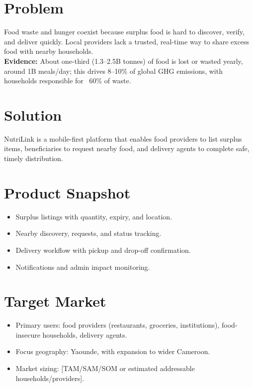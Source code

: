 \documentclass[11pt,a4paper]{article}
\begin{document}
\begin{minipage}[t]{0.48\textwidth}
\footnotesize
\section*{Problem}
\justifying
Food waste and hunger coexist because surplus food is hard to discover, verify, and deliver quickly. Local providers lack a trusted, real-time way to share excess food with nearby households.\\[4pt]
\textbf{Evidence:} About one-third (1.3--2.5B tonnes) of food is lost or wasted yearly, around 1B meals/day; this drives 8--10\% of global GHG emissions, with households responsible for ~60\% of waste.

\section*{Solution}
\justifying
NutriLink is a mobile-first platform that enables food providers to list surplus items, beneficiaries to request nearby food, and delivery agents to complete safe, timely distribution.

\section*{Product Snapshot}
\begin{itemize}
    \item Surplus listings with quantity, expiry, and location.
    \item Nearby discovery, requests, and status tracking.
    \item Delivery workflow with pickup and drop-off confirmation.
    \item Notifications and admin impact monitoring.
\end{itemize}

\section*{Target Market}
\begin{itemize}
    \item Primary users: food providers (restaurants, groceries, institutions), food-insecure households, delivery agents.
    \item Focus geography: Yaounde, with expansion to wider Cameroon.
    \item Market sizing: [TAM/SAM/SOM or estimated addressable households/providers].
\end{itemize}


\end{minipage}
\end{document}
